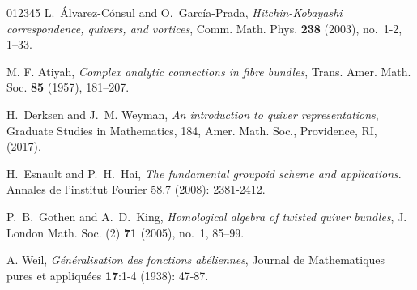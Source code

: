 \documentclass[12pt, reqno]{amsart}
\theoremstyle{plain}
\numberwithin{equation}{section}
\begin{document}
\begin{thebibliography}{012345}
 L.~\'Alvarez-C\'onsul and O.~Garc\'ia-Prada, \emph{Hitchin-Kobayashi correspondence, quivers, and vortices}, Comm. Math. Phys. {\bf 238} (2003), no.~1-2, 1--33.

 M. F. Atiyah, \emph{Complex analytic connections in fibre bundles}, Trans. Amer. Math. Soc. {\bf 85} (1957), 181–207.


 H.~Derksen and J.~M. Weyman, {\it An introduction to quiver representations}, Graduate Studies in Mathematics, 184, Amer. Math. Soc., Providence, RI, (2017).

 H.~Esnault and P.~H.~Hai, \emph{The fundamental groupoid scheme and applications}. Annales de l'institut Fourier 58.7 (2008): 2381-2412.

 P.~B.~Gothen and A.~D.~King, \emph{Homological algebra of twisted quiver bundles}, J. London Math. Soc. (2) {\bf 71} (2005), no.~1, 85--99.



 A. Weil, \emph{Généralisation des fonctions abéliennes}, Journal de Mathematiques pures et appliquées \textbf{17}:1-4 (1938): 47-87.

\end{thebibliography}
\end{document}
